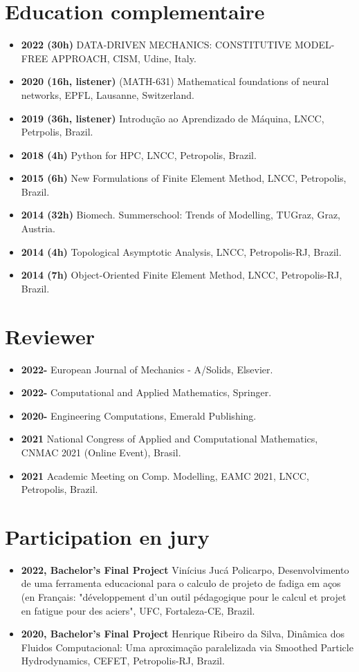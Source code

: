 \documentclass[french]{article}
\begin{document}
\section*{Education complementaire}
\begin{itemize}
\item \textbf{2022 (30h)} DATA-DRIVEN MECHANICS:
CONSTITUTIVE MODEL-FREE APPROACH, CISM, Udine, Italy.
\item \textbf{2020 (16h, listener)} (MATH-631) Mathematical foundations of neural networks, EPFL, Lausanne, Switzerland.
\item \textbf{2019 (36h, listener)} Introdução ao Aprendizado de Máquina, LNCC, Petrpolis, Brazil.
\item \textbf{2018 (4h)} Python for HPC, LNCC, Petropolis, Brazil.
\item \textbf{2015 (6h) } New Formulations of Finite Element Method, LNCC, Petropolis, Brazil.
\item \textbf{2014 (32h) } Biomech. Summerschool: Trends of Modelling, TUGraz, Graz, Austria.
\item \textbf{2014 (4h) } Topological Asymptotic Analysis, LNCC, Petropolis-RJ, Brazil. 
\item \textbf{2014 (7h) } Object-Oriented Finite Element Method, LNCC, Petropolis-RJ, Brazil.
\end{itemize}

\section*{Reviewer} 
\begin{itemize}
\item \textbf{2022-} European Journal of Mechanics - A/Solids, Elsevier.
\item \textbf{2022-} Computational and Applied Mathematics, Springer.
\item \textbf{2020-} Engineering Computations, Emerald Publishing.
\item \textbf{2021} National Congress of Applied and Computational Mathematics, CNMAC 2021 (Online Event), Brasil. 
\item \textbf{2021}  Academic Meeting on Comp. Modelling, EAMC 2021, LNCC, Petropolis, Brazil. \\

\end{itemize}

\section*{Participation en jury} 
\begin{itemize}
\item \textbf{2022, Bachelor's Final Project} Vinícius Jucá Policarpo, Desenvolvimento de uma ferramenta educacional para o calculo de projeto de fadiga em aços (en Français: "développement d’un outil pédagogique pour le calcul et projet en fatigue pour des aciers", UFC, Fortaleza-CE, Brazil.
\item \textbf{2020, Bachelor's Final Project} Henrique Ribeiro da Silva, Dinâmica dos Fluidos Computacional: Uma aproximação paralelizada via Smoothed Particle Hydrodynamics, CEFET, Petropolis-RJ, Brazil.
\end{itemize}
\end{document}
